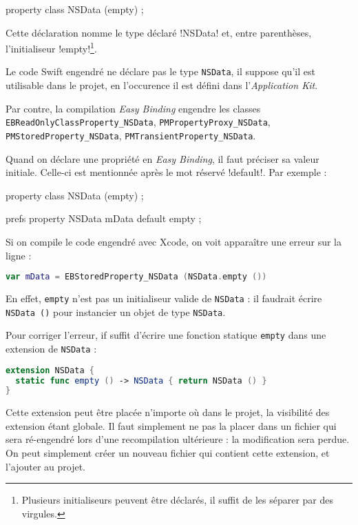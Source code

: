 \begin{ebcode}
property class NSData (empty) ;
\end{ebcode}

Cette déclaration nomme le type déclaré \eb!NSData! et, entre parenthèses, l'initialiseur \eb!empty!\footnote{Plusieurs initialiseurs peuvent être déclarés, il suffit de les séparer par des virgules.}.

Le code Swift engendré ne déclare pas le type \texttt{NSData}, il suppose qu'il est utilisable dans le projet, en l'occurence il est défini dans l'\emph{Application Kit}. 

Par contre, la compilation \emph{Easy Binding} engendre les classes \texttt{EBReadOnlyClassProperty\_NSData}, \texttt{PMPropertyProxy\_NSData}, \texttt{PMStoredProperty\_NSData}, \texttt{PMTransientProperty\_NSData}.

Quand on déclare une propriété en \emph{Easy Binding}, il faut préciser sa valeur initiale. Celle-ci est mentionnée après le mot réservé \eb!default!. Par exemple :

\begin{ebcode}
property class NSData (empty) ;

prefs {
  property NSData mData default empty ;
}
\end{ebcode}

Si on compile le code engendré avec Xcode, on voit apparaître une erreur sur la ligne :
\begin{lstlisting}[language=swift]
  var mData = EBStoredProperty_NSData (NSData.empty ())
\end{lstlisting}

En effet, \texttt{empty} n'est pas un initialiseur valide de \texttt{NSData} : il faudrait écrire \texttt{NSData ()} pour instancier un objet de type \texttt{NSData}.

Pour corriger l'erreur, if suffit d'écrire une fonction statique \texttt{empty} dans une extension de \texttt{NSData} :
\begin{lstlisting}[language=swift]
extension NSData {
  static func empty () -> NSData { return NSData () }
}
\end{lstlisting}

Cette extension peut être placée n'importe où dans le projet, la visibilité des extension étant globale. Il faut simplement ne pas la placer dans un fichier qui sera ré-engendré lors d'une recompilation ultérieure : la modification sera perdue. On peut simplement créer un nouveau fichier qui contient cette extension, et l'ajouter au projet.










